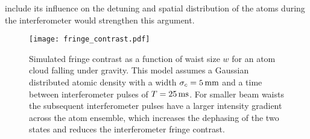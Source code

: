include its influence on the detuning and spatial distribution of the atoms
during the interferometer would strengthen this argument.
\begin{figure}[!ht]
	\centering
	\texttt{[image: fringe\_contrast.pdf]}
	\caption[Simulated fringe contrast vs beam waist size]{Simulated fringe
		contrast as a function of waist size \(w\) for an atom cloud falling under
		gravity. This model assumes a Gaussian distributed atomic density with a
		width \(\sigma_c = \sivalue{5}{\milli\metre}\) and a time between
		interferometer pulses of \(T = \sivalue{25}{\milli\second}\). For smaller
		beam waists the subsequent interferometer pulses have a larger intensity
		gradient across the atom ensemble, which increases the dephasing of the two
		states and reduces the interferometer fringe contrast.}
	\label{fig:raman_fringecontrast}
\end{figure}

